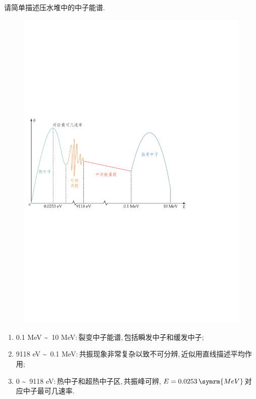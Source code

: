\begin{exercise}
    请简单描述压水堆中的中子能谱.\,
    \begin{solution}
        \begin{figure}[H]
            \centering
            \includegraphics[scale=0.6]{figures/fig5.1.pdf}
        \end{figure}
        \begin{enumerate}[(1)]
            \item 0.1 MeV \textasciitilde \, 10 MeV:\,裂变中子能谱,\,包括瞬发中子和缓发中子;\,
            \item 9118 eV \textasciitilde \, 0.1 MeV:\,共振现象非常复杂以致不可分辨,\,近似用直线描述平均作用;\,
            \item 0 \textasciitilde \, 9118 eV:\,热中子和超热中子区,\,共振峰可辨,\,$E=0.0253\,\symrm{MeV}$对应中子最可几速率.\,
        \end{enumerate}
    \end{solution}
\end{exercise}

